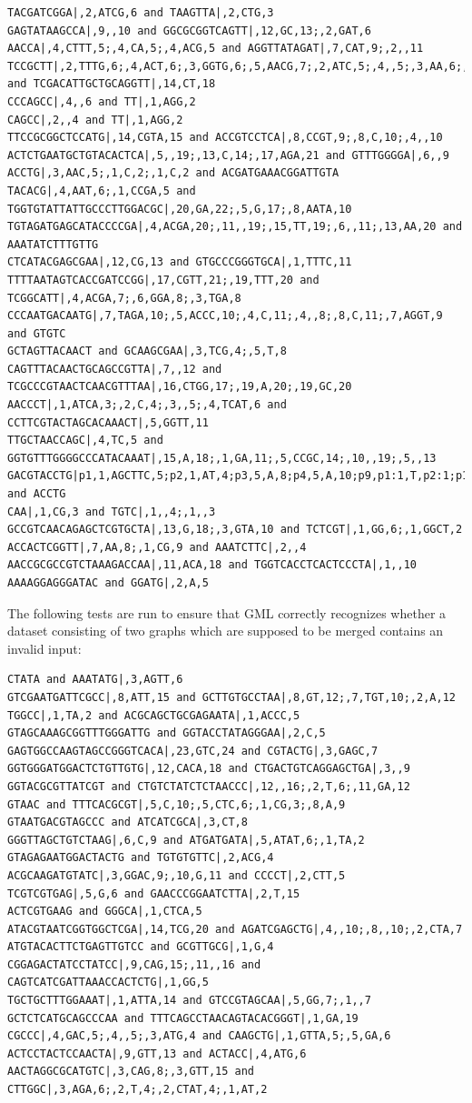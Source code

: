 \documentclass[a4paper,12pt,twoside,BCOR=10mm]{scrbook}
\begin{document}
\begin{lstlisting}
TACGATCGGA|,2,ATCG,6 and TAAGTTA|,2,CTG,3
GAGTATAAGCCA|,9,,10 and GGCGCGGTCAGTT|,12,GC,13;,2,GAT,6
AACCA|,4,CTTT,5;,4,CA,5;,4,ACG,5 and AGGTTATAGAT|,7,CAT,9;,2,,11
TCCGCTT|,2,TTTG,6;,4,ACT,6;,3,GGTG,6;,5,AACG,7;,2,ATC,5;,4,,5;,3,AA,6;,3,GGA,7 and TCGACATTGCTGCAGGTT|,14,CT,18
CCCAGCC|,4,,6 and TT|,1,AGG,2
CAGCC|,2,,4 and TT|,1,AGG,2
TTCCGCGGCTCCATG|,14,CGTA,15 and ACCGTCCTCA|,8,CCGT,9;,8,C,10;,4,,10
ACTCTGAATGCTGTACACTCA|,5,,19;,13,C,14;,17,AGA,21 and GTTTGGGGA|,6,,9
ACCTG|,3,AAC,5;,1,C,2;,1,C,2 and ACGATGAAACGGATTGTA
TACACG|,4,AAT,6;,1,CCGA,5 and TGGTGTATTATTGCCCTTGGACGC|,20,GA,22;,5,G,17;,8,AATA,10
TGTAGATGAGCATACCCCGA|,4,ACGA,20;,11,,19;,15,TT,19;,6,,11;,13,AA,20 and AAATATCTTTGTTG
CTCATACGAGCGAA|,12,CG,13 and GTGCCCGGGTGCA|,1,TTTC,11
TTTTAATAGTCACCGATCCGG|,17,CGTT,21;,19,TTT,20 and TCGGCATT|,4,ACGA,7;,6,GGA,8;,3,TGA,8
CCCAATGACAATG|,7,TAGA,10;,5,ACCC,10;,4,C,11;,4,,8;,8,C,11;,7,AGGT,9 and GTGTC
GCTAGTTACAACT and GCAAGCGAA|,3,TCG,4;,5,T,8
CAGTTTACAACTGCAGCCGTTA|,7,,12 and TCGCCCGTAACTCAACGTTTAA|,16,CTGG,17;,19,A,20;,19,GC,20
AACCCT|,1,ATCA,3;,2,C,4;,3,,5;,4,TCAT,6 and CCTTCGTACTAGCACAAACT|,5,GGTT,11
TTGCTAACCAGC|,4,TC,5 and GGTGTTTGGGGCCCATACAAAT|,15,A,18;,1,GA,11;,5,CCGC,14;,10,,19;,5,,13
GACGTACCTG|p1,1,AGCTTC,5;p2,1,AT,4;p3,5,A,8;p4,5,A,10;p9,p1:1,T,p2:1;p10,p2:1,ACT,p4:0;,p9:0,G,p10:1;,p2:1,,p4:0 and ACCTG
CAA|,1,CG,3 and TGTC|,1,,4;,1,,3
GCCGTCAACAGAGCTCGTGCTA|,13,G,18;,3,GTA,10 and TCTCGT|,1,GG,6;,1,GGCT,2
ACCACTCGGTT|,7,AA,8;,1,CG,9 and AAATCTTC|,2,,4
AACCGCGCCGTCTAAAGACCAA|,11,ACA,18 and TGGTCACCTCACTCCCTA|,1,,10
AAAAGGAGGGATAC and GGATG|,2,A,5
\end{lstlisting}

The following tests are run to ensure that GML correctly recognizes whether a dataset
consisting of two graphs which are supposed to be merged contains an invalid input:

\begin{lstlisting}
CTATA and AAATATG|,3,AGTT,6
GTCGAATGATTCGCC|,8,ATT,15 and GCTTGTGCCTAA|,8,GT,12;,7,TGT,10;,2,A,12
TGGCC|,1,TA,2 and ACGCAGCTGCGAGAATA|,1,ACCC,5
GTAGCAAAGCGGTTTGGGATTG and GGTACCTATAGGGAA|,2,C,5
GAGTGGCCAAGTAGCCGGGTCACA|,23,GTC,24 and CGTACTG|,3,GAGC,7
GGTGGGATGGACTCTGTTGTG|,12,CACA,18 and CTGACTGTCAGGAGCTGA|,3,,9
GGTACGCGTTATCGT and CTGTCTATCTCTAACCC|,12,,16;,2,T,6;,11,GA,12
GTAAC and TTTCACGCGT|,5,C,10;,5,CTC,6;,1,CG,3;,8,A,9
GTAATGACGTAGCCC and ATCATCGCA|,3,CT,8
GGGTTAGCTGTCTAAG|,6,C,9 and ATGATGATA|,5,ATAT,6;,1,TA,2
GTAGAGAATGGACTACTG and TGTGTGTTC|,2,ACG,4
ACGCAAGATGTATC|,3,GGAC,9;,10,G,11 and CCCCT|,2,CTT,5
TCGTCGTGAG|,5,G,6 and GAACCCGGAATCTTA|,2,T,15
ACTCGTGAAG and GGGCA|,1,CTCA,5
ATACGTAATCGGTGGCTCGA|,14,TCG,20 and AGATCGAGCTG|,4,,10;,8,,10;,2,CTA,7
ATGTACACTTCTGAGTTGTCC and GCGTTGCG|,1,G,4
CGGAGACTATCCTATCC|,9,CAG,15;,11,,16 and CAGTCATCGATTAAACCACTCTG|,1,GG,5
TGCTGCTTTGGAAAT|,1,ATTA,14 and GTCCGTAGCAA|,5,GG,7;,1,,7
GCTCTCATGCAGCCCAA and TTTCAGCCTAACAGTACACGGGT|,1,GA,19
CGCCC|,4,GAC,5;,4,,5;,3,ATG,4 and CAAGCTG|,1,GTTA,5;,5,GA,6
ACTCCTACTCCAACTA|,9,GTT,13 and ACTACC|,4,ATG,6
AACTAGGCGCATGTC|,3,CAG,8;,3,GTT,15 and CTTGGC|,3,AGA,6;,2,T,4;,2,CTAT,4;,1,AT,2
\end{lstlisting}
\end{document}
